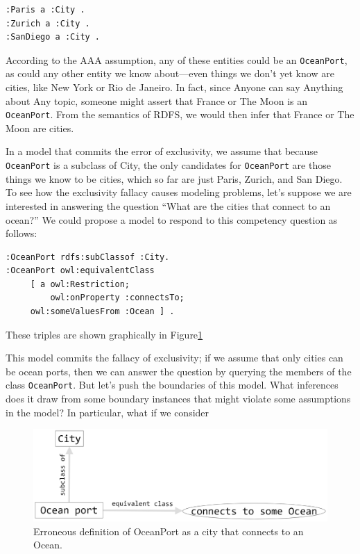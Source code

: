 \begin{lstlisting}
:Paris a :City .
:Zurich a :City .
:SanDiego a :City .
\end{lstlisting}

According to the AAA assumption, any of these entities could be an
\texttt{OceanPort}, as could any other entity we know about---even things we
don't yet know are cities, like New York or Rio de Janeiro. In fact,
since Anyone can say Anything about Any topic, someone might assert that
France or The Moon is an \texttt{OceanPort}. From the semantics of RDFS, we would
then infer that France or The Moon are cities.

In a model that commits the error of exclusivity, we assume that because
\texttt{OceanPort} is a subclass of City, the only candidates for \texttt{OceanPort} are
those things we know to be cities, which so far are just Paris, Zurich,
and San Diego. To see how the exclusivity fallacy causes modeling
problems, let's suppose we are interested in answering the question
``What are the cities that connect to an ocean?'' We could propose a
model to respond to this competency question as follows:

\begin{lstlisting}
:OceanPort rdfs:subClassof :City.
:OceanPort owl:equivalentClass
     [ a owl:Restriction;
         owl:onProperty :connectsTo;
	 owl:someValuesFrom :Ocean ] .
\end{lstlisting}

These triples are shown graphically in Figure\ref{fig:ch15.02}

This model commits the fallacy of exclusivity; if we assume that only
cities can be ocean ports, then we can answer the question by querying
the members of the class \texttt{OceanPort}. But let's push the boundaries of
this model. What inferences does it draw from some boundary instances
that might violate some assumptions in the model? In particular, what if
we consider


\begin{figure}
\centering
\includegraphics[width=5in]{SWWOv3/media/ch15/figure15-2.png}
\caption{Erroneous definition of OceanPort as a city that connects to an Ocean.}
\label{fig:ch15.02}
\end{figure}



